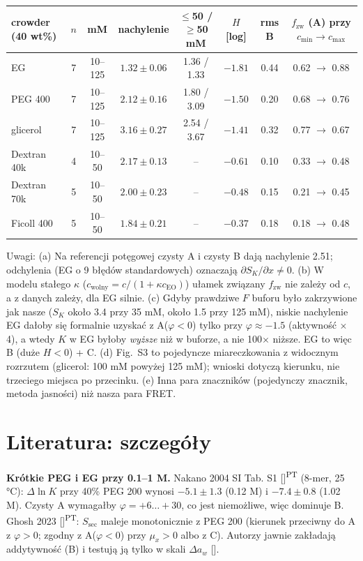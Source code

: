 \documentclass[11pt,a4paper]{article}
\newcommand{\citone}[1]{\citsep\ref{#1}\gdef\citsep{,\,}}
\newcommand{\cit}[1]{[\gdef\citsep{}\forcsvlist{\citone}{#1}]}
\newcommand{\PT}{\textsuperscript{PT}}
\begin{document}
\begin{center}\small
\begin{tabular}{lccccccc}
\toprule
crowder (40 wt\%) & $n$ & mM & nachylenie & $\le$50 / $\ge$50 mM & $H$ [log] & rms B & $f_\text{zw}$ (A) przy $c_\text{min}\to c_\text{max}$\\
\midrule
EG & 7 & 10--125 & $1.32\pm0.06$ & 1.36 / 1.33 & $-1.81$ & 0.44 & 0.62 $\to$ 0.88\\
PEG 400 & 7 & 10--125 & $2.12\pm0.16$ & 1.80 / 3.09 & $-1.50$ & 0.20 & 0.68 $\to$ 0.76\\
glicerol & 7 & 10--125 & $3.16\pm0.27$ & 2.54 / 3.67 & $-1.41$ & 0.32 & 0.77 $\to$ 0.67\\
Dextran 40k & 4 & 10--50 & $2.17\pm0.13$ & -- & $-0.61$ & 0.10 & 0.33 $\to$ 0.48\\
Dextran 70k & 5 & 10--50 & $2.00\pm0.23$ & -- & $-0.48$ & 0.15 & 0.21 $\to$ 0.45\\
Ficoll 400 & 5 & 10--50 & $1.84\pm0.21$ & -- & $-0.37$ & 0.18 & 0.18 $\to$ 0.48\\
\bottomrule
\end{tabular}\end{center}
Uwagi: (a) Na referencji potęgowej czysty A i czysty B dają nachylenie 2.51; odchylenia (EG o 9 błędów standardowych) oznaczają $\partial S_K/\partial x\neq0$. (b) W modelu stałego $\kappa$ ($c_\text{wolny}=c/(1+\kappa c_\text{EO})$) ułamek związany $f_\text{zw}$ nie zależy od $c$, a z danych zależy, dla EG silnie. (c) Gdyby prawdziwe $F$ buforu było zakrzywione jak nasze ($S_K$ około 3.4 przy 35 mM, około 1.5 przy 125 mM), niskie nachylenie EG dałoby się formalnie uzyskać z A($\varphi<0$) tylko przy $\varphi\approx-1.5$ (aktywność $\times$4), a wtedy $K$ w EG byłoby \emph{wyższe} niż w buforze, a nie 100$\times$ niższe. EG to więc B (duże $H<0$) + C. (d) Fig.~S3 to pojedyncze miareczkowania z widocznym rozrzutem (glicerol: 100 mM powyżej 125 mM); wnioski dotyczą kierunku, nie trzeciego miejsca po przecinku. (e) Inna para znaczników (pojedynczy znacznik, metoda jasności) niż nasza para FRET.

\section{Literatura: szczegóły}
\textbf{Krótkie PEG i EG przy 0.1--1 M.} Nakano 2004 SI Tab. S1 \cit{b:nak04}\PT{} (8-mer, 25 °C): $\Delta\ln K$ przy 40\% PEG 200 wynosi $-5.1\pm1.3$ (0.12 M) i $-7.4\pm0.8$ (1.02 M). Czysty A wymagałby $\varphi=+6\ldots+30$, co jest niemożliwe, więc dominuje B. Ghosh 2023 \cit{b:gh23}\PT: $S_\text{sec}$ maleje monotonicznie z PEG 200 (kierunek przeciwny do A z $\varphi>0$; zgodny z A($\varphi<0$) przy $\mu_x>0$ albo z C). Autorzy jawnie zakładają addytywność (B) i testują ją tylko w skali $\Delta a_w$ \cit{b:gh20,b:gh23}.
\end{document}
